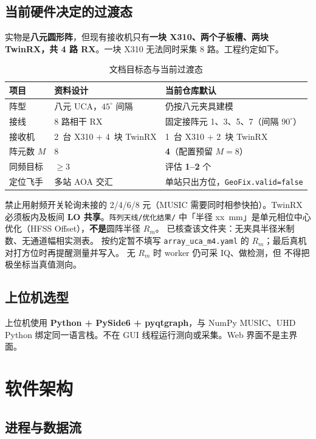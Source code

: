 \documentclass[UTF8,a4paper,12pt,zihao=-4]{ctexart}
\newcommand{\done}[1]{\textcolor{doneC}{#1}}
\newcommand{\remind}[1]{\textcolor{remindC}{#1}}
\begin{document}
\subsection{当前硬件决定的过渡态}

实物是\textbf{八元圆形阵}，但现有接收机只有\textbf{一块 X310、两个子板槽、两块 TwinRX，共 4 路 RX}。一块 X310 无法同时采集 8 路。工程约定如下。

\begin{table}[htbp]
\centering
\caption{文档目标态与当前过渡态}
\begin{tabular}{@{}lll@{}}
\toprule
项目 & 资料设计 & 当前仓库默认 \\
\midrule
阵型 & 八元 UCA，$45^\circ$ 间隔 & 仍按八元夹具建模 \\
接线 & 8 路相干 RX & 固定接阵元 1、3、5、7（间隔 $90^\circ$） \\
接收机 & 2~台 X310 + 4~块 TwinRX & 1~台 X310 + 2~块 TwinRX \\
阵元数 $M$ & 8 & \textbf{4}（配置预留 $M=8$） \\
同频目标 & $\ge 3$ & 评估 \textbf{1--2} 个 \\
定位飞手 & 多站 AOA 交汇 & 单站只出方位，\texttt{GeoFix.valid=false} \\
\bottomrule
\end{tabular}
\end{table}

禁止用射频开关轮询未接的 2/4/6/8 元（MUSIC 需要同时相参快拍）。TwinRX 必须板内及板间 \textbf{LO 共享}。\texttt{阵列天线/优化结果/} 中「半径 xx~mm」是单元相位中心优化（HFSS Offset），\textbf{不是}圆阵半径 $R_m$。
\done{已核查该文件夹：无夹具半径米制数、无通道幅相实测表。}
\remind{按约定暂不填写 \texttt{array\_uca\_m4.yaml} 的 $R_m$；最后真机对打方位时再提醒测量并写入。}
无 $R_m$ 时 \done{worker 仍可采 IQ、做检测}，但 \remind{不得把极坐标当真值测向}。

\subsection{上位机选型}

上位机使用 \textbf{Python + PySide6 + pyqtgraph}，与 NumPy MUSIC、UHD Python 绑定同一语言栈。不在 GUI 线程运行测向或采集。Web 界面不是主界面。

\section{软件架构}

\subsection{进程与数据流}
\end{document}
